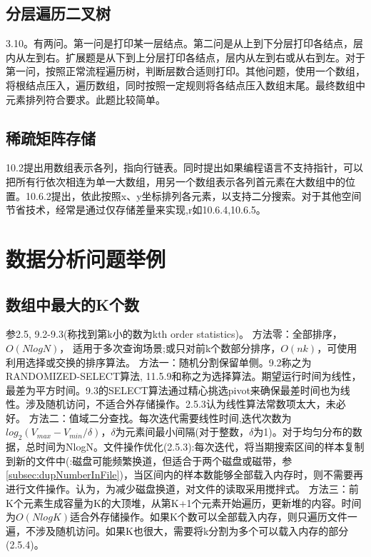 \subsection{分层遍历二叉树}
\cite{bop}3.10。有两问。第一问是打印某一层结点。第二问是从上到下分层打印各结点，层内从左到右。扩展题是从下到上分层打印各结点，层内从左到右或从右到左。对于第一问，按照正常流程遍历树，判断层数合适则打印。其他问题，使用一个数组，将根结点压入，遍历数组，同时按照一定规则将各结点压入数组末尾。最终数组中元素排列符合要求。此题比较简单。



\subsection{稀疏矩阵存储}
\cite{pp}10.2提出用数组表示各列，指向行链表。同时提出如果编程语言不支持指针，可以把所有行依次相连为单一大数组，用另一个数组表示各列首元素在大数组中的位置。\cite{pp}10.6.2提出，依此按照x、y坐标排列各元素，以支持二分搜索。对于其他空间节省技术，经常是通过仅存储差量来实现,r如\cite{pp}10.6.4,10.6.5。
\label{problem:sparseMatrix}


\section{数据分析问题举例}

\subsection{数组中最大的K个数}
参\cite{bop}2.5, \cite{ita}9.2-9.3(\cite{ita}称找到第k小的数为kth order statistics)。
方法零：全部排序，$O(NlogN)$， 适用于多次查询场景;或只对前k个数部分排序，$O(nk)$，可使用利用选择或交换的排序算法\cite{subsec:sortAthmClass}。
方法一：随机分割保留单侧。\cite{ita}9.2称之为RANDOMIZED-SELECT算法, \cite{pp}11.5.9和\cite{wikipedia}称之为选择算法。期望运行时间为线性，最差为平方时间。\cite{ita}9.3的SELECT算法通过精心挑选pivot来确保最差时间也为线性。涉及随机访问，不适合外存储操作。\cite{bop}2.5.3认为线性算法常数项太大，未必好。
方法二：值域二分查找。每次迭代需要线性时间,迭代次数为$log_{2}(V_{max}-V_{min}/\delta)$，$\delta$为元素间最小间隔(对于整数，$\delta$为1)。对于均匀分布的数据，总时间为NlogN。文件操作优化(\cite{bop}2.5.3):每次迭代，将当期搜索区间的样本复制到新的文件中(\cite{self}:磁盘可能频繁换道，但适合于两个磁盘或磁带，参\ref{subsec:dupNumberInFile})，当区间内的样本数能够全部载入内存时，则不需要再进行文件操作。\cite{self}认为，为减少磁盘换道，对文件的读取采用搅拌式。
方法三：前K个元素生成容量为K的大顶堆，从第K+1个元素开始遍历，更新堆的内容。时间为$O(NlogK)$适合外存储操作。如果K个数可以全部载入内存，则只遍历文件一遍，不涉及随机访问。如果K也很大，需要将k分割为多个可以载入内存的部分(\cite{bop}2.5.4)。
\label{subsec:orderStatistics}

